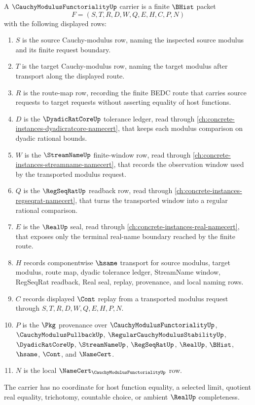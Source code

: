 \begin{definition}
\label{def:cauchy-modulus-functoriality-carrier}
A $\CauchyModulusFunctorialityUp$ carrier is a finite $\BHist$ packet
$$
F=(S,T,R,D,W,Q,E,H,C,P,N)
$$
with the following displayed rows:
\begin{enumerate}
\item $S$ is the source Cauchy-modulus row, naming the inspected source modulus and its finite request boundary.
\item $T$ is the target Cauchy-modulus row, naming the target modulus after transport along the displayed route.
\item $R$ is the route-map row, recording the finite BEDC route that carries source requests to target requests without asserting equality of host functions.
\item $D$ is the $\DyadicRatCoreUp$ tolerance ledger, read through \autoref{ch:concrete-instances-dyadicratcore-namecert}, that keeps each modulus comparison on dyadic rational bounds.
\item $W$ is the $\StreamNameUp$ finite-window row, read through \autoref{ch:concrete-instances-streamname-namecert}, that records the observation window used by the transported modulus request.
\item $Q$ is the $\RegSeqRatUp$ readback row, read through \autoref{ch:concrete-instances-regseqrat-namecert}, that turns the transported window into a regular rational comparison.
\item $E$ is the $\RealUp$ seal, read through \autoref{ch:concrete-instances-real-namecert}, that exposes only the terminal real-name boundary reached by the finite route.
\item $H$ records componentwise $\hsame$ transport for source modulus, target modulus, route map, dyadic tolerance ledger, StreamName window, RegSeqRat readback, Real seal, replay, provenance, and local naming rows.
\item $C$ records displayed $\Cont$ replay from a transported modulus request through $S,T,R,D,W,Q,E,H,P,N$.
\item $P$ is the $\Pkg$ provenance over $\CauchyModulusFunctorialityUp$, $\CauchyModulusPullbackUp$, $\RegularCauchyModulusStabilityUp$, $\DyadicRatCoreUp$, $\StreamNameUp$, $\RegSeqRatUp$, $\RealUp$, $\BHist$, $\hsame$, $\Cont$, and $\NameCert$.
\item $N$ is the local $\NameCert_{\CauchyModulusFunctorialityUp}$ row.
\end{enumerate}
The carrier has no coordinate for host function equality, a selected limit, quotient real equality, trichotomy, countable choice, or ambient $\RealUp$ completeness.
\end{definition}


